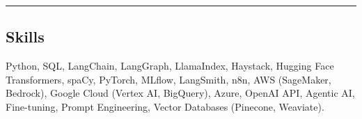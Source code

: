 \documentclass[11pt,letterpaper]{article}
\begin{document}
\hrule
\subsection*{\Large Skills}
	
    Python, SQL, LangChain, LangGraph, LlamaIndex, Haystack, Hugging Face Transformers, spaCy, PyTorch, MLflow, LangSmith, n8n, AWS (SageMaker, Bedrock), Google Cloud (Vertex AI, BigQuery), Azure, OpenAI API, Agentic AI, Fine-tuning, Prompt Engineering, Vector Databases (Pinecone, Weaviate).
\end{document}
